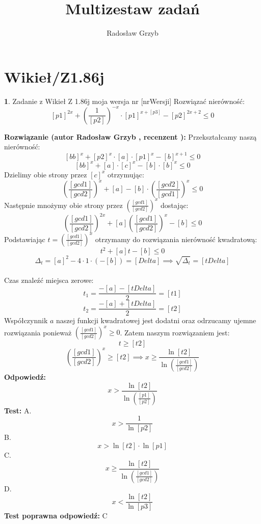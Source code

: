 \documentclass[12pt, a4paper]{article}
\title{Multizestaw zadań}
\author{Radosław Grzyb}
\date{}
\theoremstyle{definition} %
\newtheorem{zad}{}
\newcommand{\kategoria}[1]{\section{#1}} %
\newcommand{\zadStart}[1]{\begin{zad}#1\newline} %
\newcommand{\zadStop}{\end{zad}}   %
\newcommand{\rozwStart}[2]{\noindent \textbf{Rozwiązanie (autor #1 , recenzent #2): }\newline} %
\newcommand{\rozwStop}{\newline}                                            %
\newcommand{\odpStart}{\noindent \textbf{Odpowiedź:}\newline}    %
\newcommand{\odpStop}{\newline}                                             %
\newcommand{\testStart}{\noindent \textbf{Test:}\newline} %
\newcommand{\testStop}{\newline} %
\newcommand{\kluczStart}{\noindent \textbf{Test poprawna odpowiedź:}\newline} %
\newcommand{\kluczStop}{\newline} %
\begin{document}
\maketitle
\kategoria{Wikieł/Z1.86j}
\zadStart{Zadanie z Wikieł Z 1.86j moja wersja nr [nrWersji]}
Rozwiązać nierówność:
$$[p1]^{2x}+\left(\frac{1}{[p2]}\right)^{-x}\cdot[p1]^{x+[p3]}-[p2]^{2x+2}\leq0$$
\zadStop
\rozwStart{Radosław Grzyb}{}
Przekształcamy naszą nierówność:
$$[bb]^{x}+[p2]^{x}\cdot[a]\cdot[p1]^{x}-[b]^{x+1}\leq0$$
$$[bb]^{x}+[a]\cdot[c]^{x}-[b]\cdot[b]^{x}\leq0$$
Dzielimy obie strony przez $[c]^{x}$ otrzymując:
$$\left(\frac{[gcd1]}{[gcd2]}\right)^{x}+[a]-[b]\cdot\left(\frac{[gcd2]}{[gcd1]}\right)^{x}\leq0$$
Następnie mnożymy obie strony przez $\left(\frac{[gcd1]}{[gcd2]}\right)^{x}$ dostając:
$$\left(\frac{[gcd1]}{[gcd2]}\right)^{2x}+[a]\left(\frac{[gcd1]}{[gcd2]}\right)^{x}-[b]\leq0$$
Podstawiając $t=\left(\frac{[gcd1]}{[gcd2]}\right)^{x}$ otrzymamy do rozwiązania nierówność kwadratową:
$$t^{2}+[a]t-[b]\leq0$$
$$\Delta_{t}=[a]^2-4\cdot1\cdot(-[b])=[Delta]\implies \sqrt{\Delta_{t}}=[tDelta]$$\\
Czas znaleźć miejsca zerowe:
$$t_{1}=\frac{-[a]-[tDelta]}{2}=[t1]$$
$$t_{2}=\frac{-[a]+[tDelta]}{2}=[t2]$$
Współczynnik $a$ naszej funkcji kwadratowej jest dodatni oraz odrzucamy ujemne rozwiązania ponieważ $\left(\frac{[gcd1]}{[gcd2]}\right)^{x}\geq0$. Zatem naszym rozwiązaniem jest:
$$t\geq[t2]$$
$$\left(\frac{[gcd1]}{[gcd2]}\right)^{x}\geq[t2]\implies x\geq\frac{\ln[t2]}{\ln\left(\frac{[gcd1]}{[gcd2]}\right)}$$
\rozwStop
\odpStart
$$x>\frac{\ln[t2]}{\ln\left(\frac{[p1]}{[p2]}\right)}$$
\odpStop
\testStart
A.$$x>\frac{1}{\ln[p2]}$$
B.$$x>\ln[t2]\cdot\ln[p1]$$
C.$$x\geq\frac{\ln[t2]}{\ln\left(\frac{[gcd1]}{[gcd2]}\right)}$$
D.$$x<\frac{\ln[t2]}{\ln[p3]}$$
\testStop
\kluczStart
C
\kluczStop
\end{document}
